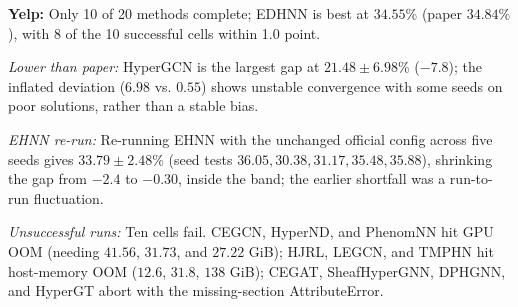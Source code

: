 \documentclass[11pt,a4paper]{article}
\begin{document}
\par\smallskip
\noindent\textbf{Yelp:} Only 10 of 20 methods complete; EDHNN is best at $34.55\%$ (paper $34.84\%$), with 8 of the 10 successful cells within 1.0 point.

\noindent\textit{Lower than paper:} HyperGCN is the largest gap at $21.48\pm6.98\%$ ($-7.8$); the inflated deviation ($6.98$ vs. $0.55$) shows unstable convergence with some seeds on poor solutions, rather than a stable bias.

\noindent\textit{EHNN re-run:} Re-running EHNN with the unchanged official config across five seeds gives $33.79\pm2.48\%$ (seed tests $36.05, 30.38, 31.17, 35.48, 35.88$), shrinking the gap from $-2.4$ to $-0.30$, inside the band; the earlier shortfall was a run-to-run fluctuation.

\noindent\textit{Unsuccessful runs:} Ten cells fail. CEGCN, HyperND, and PhenomNN hit GPU OOM (needing $41.56$, $31.73$, and $27.22$ GiB); HJRL, LEGCN, and TMPHN hit host-memory OOM ($12.6$, $31.8$, $138$ GiB); CEGAT, SheafHyperGNN, DPHGNN, and HyperGT abort with the missing-section AttributeError.
\end{document}
